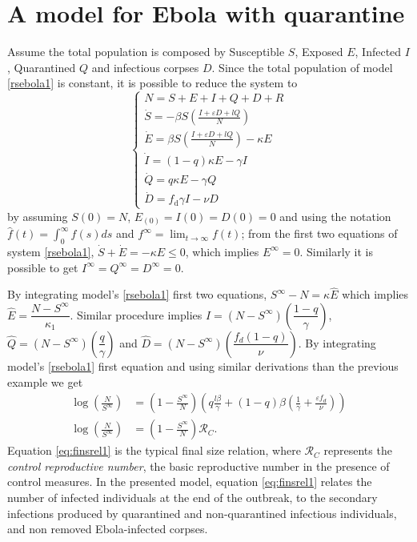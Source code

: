 \documentclass{book}\usepackage[]{graphicx}\usepackage[]{color}
\begin{document}
\section*{A model for Ebola with quarantine}
Assume the total population is composed by Susceptible $S$, Exposed $E$, Infected $I$, Quarantined $Q$ and infectious corpses $D$.
Since the total population of model \eqref{rsebola1} is constant, it is possible to reduce the system to
\begin{equation} \label{rsebola1}
\left\{\begin{array}{ll}%
N=S+E+I+Q+D+R\\
\dot S = -\beta S  \left( \frac{I + \varepsilon D + l Q}{N}\right)\\
\dot E = \beta S  \left( \frac{I + \varepsilon D + l Q}{N}\right)-\kappa E\\
\dot I= (1-q)\kappa E - \gamma I \\
\dot Q= q \kappa E - \gamma Q\\
\dot D=f_{\text{d}}\gamma I-\nu D
\end{array}\right.
\end{equation}
%
by assuming $S(0)=N$, $E_(0)=I(0)=D(0)=0$ and using the notation $\hat{f}(t)=\int_0^\infty f(s) ds$ and $f^\infty=\lim_{t\rightarrow\infty} f(t)$; from the first two equations of system \eqref{rsebola1}, $\dot{S}+\dot{E}=-\kappa E\leq 0$, which implies $E^\infty=0$. Similarly it is possible to get $I^\infty=Q^\infty=D^\infty=0$.
%

By integrating model's \eqref{rsebola1} first two equations, $S^\infty-N=\kappa \hat{E}$ which implies $\hat{E}=\dfrac{N-S^\infty}{\kappa_1}$. Similar procedure implies $\hat{I}=(N-S^\infty)\left(\dfrac{1-q}{\gamma}\right)$, $\hat{Q}=(N-S^\infty)\left(\dfrac{q}{\gamma}\right)$ and $\hat{D}=(N-S^\infty)\left(\dfrac{f_d(1-q)}{\nu}\right)$.
%
By integrating model's \eqref{rsebola1} first equation and using similar derivations than the previous example we get
\begin{align}
\nonumber \log\left(\frac{N}{S^\infty}\right) &= \left(1-\frac{S^\infty}{N}\right)\left( q\frac{l\beta}{\gamma}+(1-q)\beta\left(\frac{1}{\gamma}+\frac{\varepsilon f_d}{\nu} \right) \right)\\
\log\left(\frac{N}{S^\infty}\right) &= \left(1-\frac{S^\infty}{N}\right) \mathcal{R}_C. \label{eq:finsrel1}
\end{align}
Equation \ref{eq:finsrel1} is the typical final size relation, where $\mathcal{R}_C$ represents the {\it control reproductive number}, the basic reproductive number in the presence of control measures.
%
In the presented model, equation \eqref{eq:finsrel1} relates the number of infected individuals at the end of the outbreak, to the secondary infections produced by quarantined and non-quarantined infectious individuals, and non removed Ebola-infected corpses. 
\end{document}

